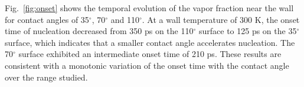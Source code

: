 Fig.~\ref{fig:onset} shows the temporal evolution of the vapor fraction near the wall for contact angles of 35$^\circ$, 70$^\circ$ and 110$^\circ$. At a wall temperature of 300 K, the onset time of nucleation decreased from 350 ps on the 110$^\circ$ surface to 125 ps on the 35$^\circ$ surface, which indicates that a smaller contact angle accelerates nucleation. The 70$^\circ$ surface exhibited an intermediate onset time of 210 ps. These results are consistent with a monotonic variation of the onset time with the contact angle over the range studied.